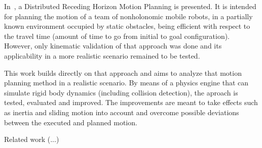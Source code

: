 \documentclass[letterpaper, 10 pt, conference]{ieeeconf}  %
\begin{document}
In~\cite{MendesFilho2015}, a Distributed Receding Horizon Motion Planning is presented. It is intended for planning the motion of a team of nonholonomic mobile robots, in a partially known environment occupied by static obstacles, being efficient with respect to the travel time (amount of time to go from initial to goal configuration). However, only kinematic validation of that approach was done and its applicability in a more realistic scenario remained to be tested.

This work builds directly on that approach and aims to analyze that motion planning method in a realistic scenario. By means of a physics engine that can simulate rigid body dynamics (including collision detection), the aproach is tested, evaluated and improved. The improvements are meant to take effects such as inertia and sliding motion into account and overcome possible deviations between the executed and planned motion.

Related work (...)






\end{document}
